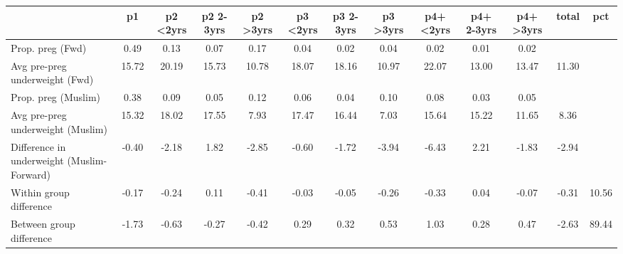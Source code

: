 \begin{tabular}{l*{12}{c}}
\toprule
            &\multicolumn{1}{c}{p1}&\multicolumn{1}{c}{p2 \textless2yrs}&\multicolumn{1}{c}{p2 2-3yrs}&\multicolumn{1}{c}{p2 \textgreater3yrs}&\multicolumn{1}{c}{p3 \textless2yrs}&\multicolumn{1}{c}{p3 2-3yrs}&\multicolumn{1}{c}{p3 \textgreater3yrs}&\multicolumn{1}{c}{p4+ \textless2yrs}&\multicolumn{1}{c}{p4+ 2-3yrs}&\multicolumn{1}{c}{p4+ \textgreater3yrs}&\multicolumn{1}{c}{total}&\multicolumn{1}{c}{pct}\\
\midrule
\midrule
Prop. preg (Fwd)&        0.49&        0.13&        0.07&        0.17&        0.04&        0.02&        0.04&        0.02&        0.01&        0.02&            &            \\
Avg pre-preg underweight (Fwd)&       15.72&       20.19&       15.73&       10.78&       18.07&       18.16&       10.97&       22.07&       13.00&       13.47&       11.30&            \\
Prop. preg (Muslim)&        0.38&        0.09&        0.05&        0.12&        0.06&        0.04&        0.10&        0.08&        0.03&        0.05&            &            \\
Avg pre-preg underweight (Muslim)&       15.32&       18.02&       17.55&        7.93&       17.47&       16.44&        7.03&       15.64&       15.22&       11.65&        8.36&            \\
Difference in underweight (Muslim-Forward)&       -0.40&       -2.18&        1.82&       -2.85&       -0.60&       -1.72&       -3.94&       -6.43&        2.21&       -1.83&       -2.94&            \\
Within group difference&       -0.17&       -0.24&        0.11&       -0.41&       -0.03&       -0.05&       -0.26&       -0.33&        0.04&       -0.07&       -0.31&       10.56\\
Between group difference&       -1.73&       -0.63&       -0.27&       -0.42&        0.29&        0.32&        0.53&        1.03&        0.28&        0.47&       -2.63&       89.44\\
\bottomrule
\end{tabular}

